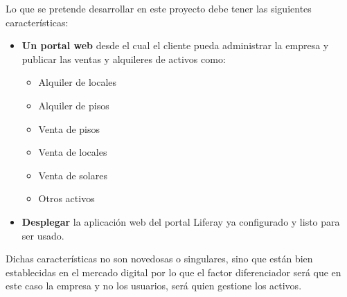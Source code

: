 \par Lo que se pretende desarrollar en este proyecto debe tener las siguientes características:
\begin{itemize}
	\item \textbf{Un portal web} desde el cual el cliente pueda administrar la empresa y publicar las ventas y alquileres de activos como:
	\begin{itemize}
	 	\item Alquiler de locales
	 	\item Alquiler de pisos
	 	\item Venta de pisos
	 	\item Venta de locales
	 	\item Venta de solares
	 	\item Otros activos
	 \end{itemize}
	 \item \textbf{Desplegar} la aplicación web del portal Liferay ya configurado y listo para ser usado.
\end{itemize}
\par Dichas características no son novedosas o singulares, sino que están bien establecidas en el mercado digital por lo que el factor diferenciador será que en este caso la empresa y no los usuarios, será quien gestione los activos.
